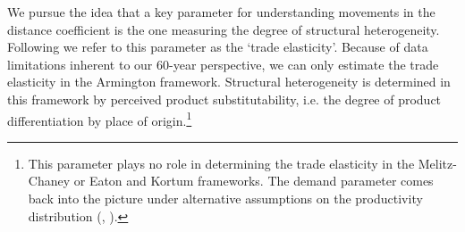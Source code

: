 \documentclass[12pt,twoside,a4paper,notitlepage]{article}
\begin{document}
We pursue the idea that a key parameter for understanding movements in the distance coefficient is the one measuring the degree of structural heterogeneity.
Following \cite{Arkolakis2012} we refer to this parameter as the `trade elasticity'.
Because of data limitations inherent to our 60-year perspective, we can only estimate the trade elasticity in the Armington framework.
Structural heterogeneity is determined in this framework by perceived product substitutability, i.e.
the degree of product differentiation by place of origin.\footnote{This parameter plays no role in determining the trade elasticity in the Melitz-Chaney or Eaton and Kortum frameworks. The demand parameter comes back into the picture under alternative assumptions on the productivity distribution  (\cite{Bas2017}, \cite{Feenstra2018a}).}
\end{document}
